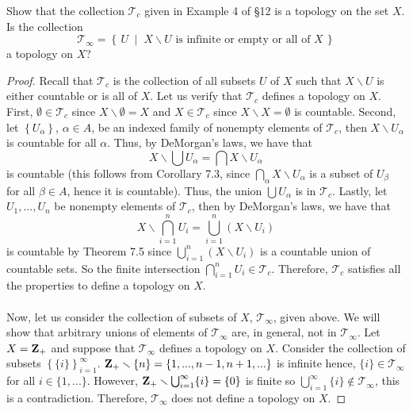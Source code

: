 \begin{problem}[Munkres, \S13, 3.]
Show that the collection $\mathcal{T}_c$ given in
Example 4 of \S12 is a topology on the set $X$. Is the collection
\[
\mathcal{T}_\infty=
\left\{\,U\;\middle|\;
\text{$X\smallsetminus U$ is infinite or empty or all of $X$}
\,\right\}
\]
a topology on $X$?
\end{problem}
\begin{proof}
Recall that $\mathcal{T}_c$ is the collection of all subsets $U$
of $X$ such that $X\smallsetminus U$ is either countable or is
all of $X$. Let us verify that $\mathcal{T}_c$ defines a topology
on $X$. First, $\emptyset\in\mathcal{T}_c$ since
$X\smallsetminus\emptyset=X$ and $X\in\mathcal{T}_c$ since
$X\smallsetminus X=\emptyset$ is countable. Second, let
$\left\{U_\alpha\right\}$, $\alpha\in A$, be an indexed
family of nonempty elements of $\mathcal{T}_c$, then
$X\smallsetminus U_\alpha$ is countable for all $\alpha$. Thus,
by DeMorgan's laws, we have that
\[
X\smallsetminus\bigcup U_\alpha=\bigcap X\smallsetminus U_\alpha
\]
is countable (this follows from Corollary 7.3, since
$\bigcap_\alpha X\smallsetminus U_\alpha$ is a subset of
$U_\beta$ for all $\beta\in A$, hence it is countable). Thus, the
union $\bigcup U_\alpha$ is in $\mathcal{T}_c$. Lastly, let
$U_1,...,U_n$ be nonempty elements of $\mathcal{T}_c$, then by
DeMorgan's laws, we have that
\[
X\smallsetminus\bigcap_{i=1}^n U_i=\bigcup_{i=1}^n (X\smallsetminus U_i)
\]
is countable by Theorem 7.5 since
$\bigcup_{i=1}^n(X\smallsetminus U_i)$ is a countable union of
countable sets. So the finite intersection
$\bigcap_{i=1}^nU_i\in\mathcal{T}_c$. Therefore, $\mathcal{T}_c$
satisfies all the properties to define a topology on $X$.
\\\\
Now, let us consider the collection of subsets of $X$,
$\mathcal{T}_\infty$, given above. We will show that arbitrary
unions of elements of $\mathcal{T}_\infty$ are, in general, not
in $\mathcal{T}_\infty$. Let $X=\mathbf{Z}_+$ and suppose that
$\mathcal{T}_\infty$ defines a topology on $X$. Consider the
collection of subsets
$\left\{\{i\}\right\}_{i=1}^\infty$. $\mathbf{Z}_+\smallsetminus\{n\}=\left\{1,...,n-1,n+1,...\right\}$
is infinite hence, $\{i\}\in\mathcal{T}_\infty$ for all
$i\in\{1,...\}$. However,
$\mathbf{Z}_+\smallsetminus\bigcup_{i=1}^\infty\{i\}=\{0\}$ is finite so
$\bigcup_{i=1}^\infty\{i\}\notin\mathcal{T}_\infty$, this is a
contradiction. Therefore, $\mathcal{T}_\infty$ does not define a
topology on $X$.
\end{proof}
\newpage


